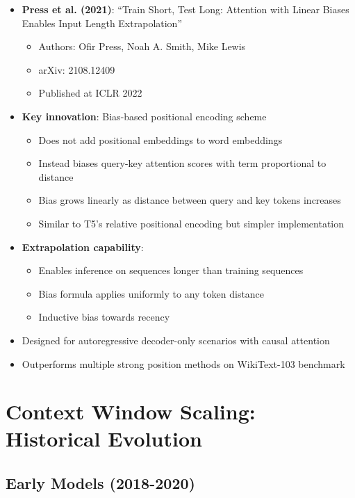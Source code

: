 \documentclass[11pt,letterpaper]{article}
\begin{document}
\begin{itemize}[leftmargin=*]
    \item \textbf{Press et al. (2021)}: ``Train Short, Test Long: Attention with Linear Biases Enables Input Length Extrapolation''
    \begin{itemize}
        \item Authors: Ofir Press, Noah A. Smith, Mike Lewis
        \item arXiv: 2108.12409
        \item Published at ICLR 2022
    \end{itemize}

    \item \textbf{Key innovation}: Bias-based positional encoding scheme
    \begin{itemize}
        \item Does not add positional embeddings to word embeddings
        \item Instead biases query-key attention scores with term proportional to distance
        \item Bias grows linearly as distance between query and key tokens increases
        \item Similar to T5's relative positional encoding but simpler implementation
    \end{itemize}

    \item \textbf{Extrapolation capability}:
    \begin{itemize}
        \item Enables inference on sequences longer than training sequences
        \item Bias formula applies uniformly to any token distance
        \item Inductive bias towards recency
    \end{itemize}

    \item Designed for autoregressive decoder-only scenarios with causal attention
    \item Outperforms multiple strong position methods on WikiText-103 benchmark
\end{itemize}

\section{Context Window Scaling: Historical Evolution}

\subsection{Early Models (2018-2020)}
\end{document}

